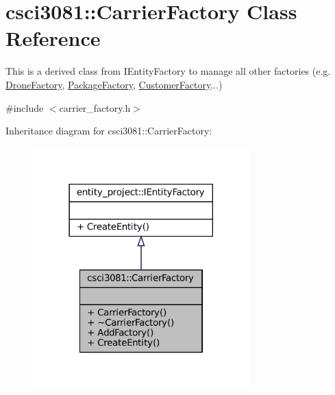 \hypertarget{classcsci3081_1_1CarrierFactory}{}\section{csci3081\+:\+:Carrier\+Factory Class Reference}
\label{classcsci3081_1_1CarrierFactory}


This is a derived class from I\+Entity\+Factory to manage all other factories (e.\+g. \hyperlink{classcsci3081_1_1DroneFactory}{Drone\+Factory}, \hyperlink{classcsci3081_1_1PackageFactory}{Package\+Factory}, \hyperlink{classcsci3081_1_1CustomerFactory}{Customer\+Factory}...)  




{\ttfamily \#include $<$carrier\+\_\+factory.\+h$>$}



Inheritance diagram for csci3081\+:\+:Carrier\+Factory\+:
\nopagebreak
\begin{figure}[H]
\begin{center}
\leavevmode
\includegraphics[width=237pt]{classcsci3081_1_1CarrierFactory__inherit__graph}
\end{center}
\end{figure}
